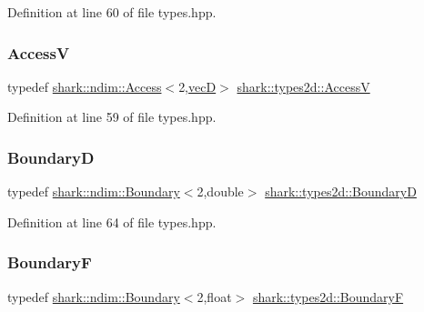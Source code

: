 Definition at line 60 of file types.\+hpp.

\hypertarget{namespaceshark_1_1types2d_a4bf6da157911632c8f9e21dadaae4c15}{}\label{namespaceshark_1_1types2d_a4bf6da157911632c8f9e21dadaae4c15} 
\subsubsection{\texorpdfstring{AccessV}{AccessV}}
{\footnotesize\ttfamily typedef \hyperlink{classshark_1_1ndim_1_1_access}{shark\+::ndim\+::\+Access}$<$2,\hyperlink{namespaceshark_1_1types2d_a738ed8ca791a1fce6898c99ca68afc45}{vecD}$>$ \hyperlink{namespaceshark_1_1types2d_a4bf6da157911632c8f9e21dadaae4c15}{shark\+::types2d\+::\+AccessV}}



Definition at line 59 of file types.\+hpp.

\hypertarget{namespaceshark_1_1types2d_a98e10b5b5ecbc2e222cc5c275c55940b}{}\label{namespaceshark_1_1types2d_a98e10b5b5ecbc2e222cc5c275c55940b} 
\subsubsection{\texorpdfstring{BoundaryD}{BoundaryD}}
{\footnotesize\ttfamily typedef \hyperlink{classshark_1_1ndim_1_1_boundary}{shark\+::ndim\+::\+Boundary}$<$2,double$>$ \hyperlink{namespaceshark_1_1types2d_a98e10b5b5ecbc2e222cc5c275c55940b}{shark\+::types2d\+::\+BoundaryD}}



Definition at line 64 of file types.\+hpp.

\hypertarget{namespaceshark_1_1types2d_a25b77980ffbf351c7a2aed02cbce2b28}{}\label{namespaceshark_1_1types2d_a25b77980ffbf351c7a2aed02cbce2b28} 
\subsubsection{\texorpdfstring{BoundaryF}{BoundaryF}}
{\footnotesize\ttfamily typedef \hyperlink{classshark_1_1ndim_1_1_boundary}{shark\+::ndim\+::\+Boundary}$<$2,float$>$ \hyperlink{namespaceshark_1_1types2d_a25b77980ffbf351c7a2aed02cbce2b28}{shark\+::types2d\+::\+BoundaryF}}



